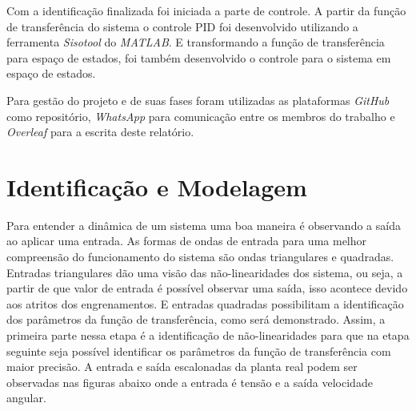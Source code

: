\documentclass[a4paper,11pt]{article}
\begin{document}
Com a identificação finalizada foi iniciada a parte de controle. A partir da função de transferência do sistema o controle PID foi desenvolvido utilizando a ferramenta \textit{Sisotool} do \textit{MATLAB}. E transformando a função de transferência para espaço de estados, foi também desenvolvido o controle para o sistema em espaço de estados.

Para gestão do projeto e de suas fases foram utilizadas as plataformas \textit{GitHub} como repositório, \textit{WhatsApp} para comunicação entre os membros do trabalho e \textit{Overleaf} para a escrita deste relatório. 



\section{Identificação e Modelagem}


Para entender a dinâmica de um sistema uma boa maneira é observando a saída ao aplicar uma entrada. As formas de ondas de entrada para uma melhor compreensão do funcionamento do sistema são ondas triangulares e quadradas. Entradas triangulares dão uma visão das não-linearidades dos sistema, ou seja, a partir de que valor de entrada é possível observar uma saída, isso acontece devido aos atritos dos engrenamentos. E entradas quadradas possibilitam a identificação dos parâmetros da função de transferência, como será demonstrado. Assim, a primeira parte nessa etapa é a identificação de não-linearidades para que na etapa seguinte seja possível identificar os parâmetros da função de transferência com maior precisão. A entrada e saída escalonadas da planta real podem ser observadas nas figuras abaixo onde a entrada é tensão e a saída velocidade angular.
\end{document}
